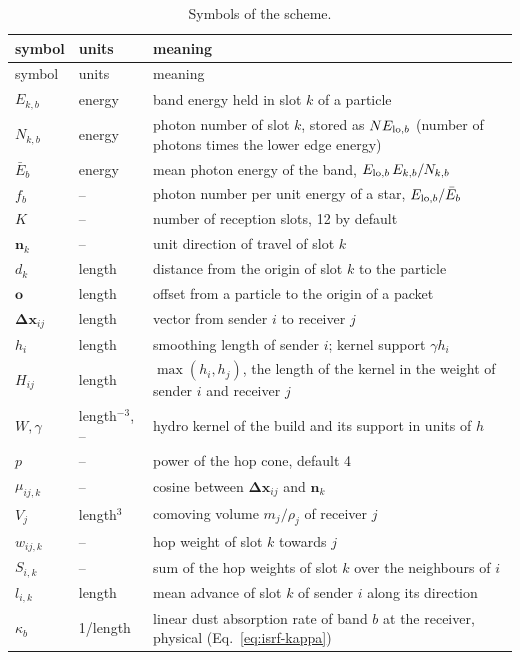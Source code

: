 \begin{longtable}{p{1.9cm}p{3.4cm}p{8.6cm}}
\caption{Symbols of the scheme.}
\label{tab:packet-symbols}\\
\toprule
symbol & units & meaning \\
\midrule
\endfirsthead
\toprule
symbol & units & meaning \\
\midrule
\endhead
$E_{k,b}$ & energy & band energy held in slot $k$ of a particle \\
$N_{k,b}$ & energy & photon number of slot $k$, stored as $N E_{{\rm lo},b}$ (number of photons times the lower edge energy) \\
$\bar E_b$ & energy & mean photon energy of the band, $E_{{\rm lo},b}\,E_{k,b}/N_{k,b}$ \\
$f_b$ & -- & photon number per unit energy of a star, $E_{{\rm lo},b}/\bar E_b$ \\
$K$ & -- & number of reception slots, 12 by default \\
$\boldsymbol{n}_k$ & -- & unit direction of travel of slot $k$ \\
$d_k$ & length & distance from the origin of slot $k$ to the particle \\
$\boldsymbol{o}$ & length & offset from a particle to the origin of a packet \\
$\boldsymbol{\Delta x}_{ij}$ & length & vector from sender $i$ to receiver $j$ \\
$h_i$ & length & smoothing length of sender $i$; kernel support $\gamma h_i$ \\
$H_{ij}$ & length & $\max(h_i,h_j)$, the length of the kernel in the weight of sender $i$ and receiver $j$ \\
$W,\gamma$ & length$^{-3}$, -- & hydro kernel of the build and its support in units of $h$ \\
$p$ & -- & power of the hop cone, default 4 \\
$\mu_{ij,k}$ & -- & cosine between $\boldsymbol{\Delta x}_{ij}$ and $\boldsymbol{n}_k$ \\
$V_j$ & length$^3$ & comoving volume $m_j/\rho_j$ of receiver $j$ \\
$w_{ij,k}$ & -- & hop weight of slot $k$ towards $j$ \\
$S_{i,k}$ & -- & sum of the hop weights of slot $k$ over the neighbours of $i$ \\
$l_{i,k}$ & length & mean advance of slot $k$ of sender $i$ along its direction \\
$\kappa_b$ & 1/length & linear dust absorption rate of band $b$ at the receiver, physical (Eq.~\eqref{eq:isrf-kappa}) \\

\end{longtable}
